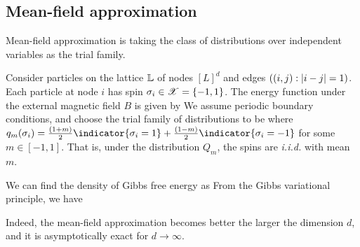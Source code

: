 \documentclass[letterpaper,english,10pt]{article}
\begin{document}
\subsection{Mean-field approximation}
Mean-field approximation is taking the class of distributions over independent variables as the trial family. 
\begin{shaded*}
\begin{exmp} 
Consider particles on the lattice $\mathbb{L}$ of nodes $[L]^d$ and edges $((i,j): \left\lvert i-j\right\rvert=1)$. 
Each particle at node $i$ has spin $\sigma_i \in \mathscr{X} = \left\{-1,1\right\}$. 
The energy function under the external magnetic field $B$ is given by 
We assume periodic boundary conditions, and choose the trial family of distributions to be 
where $q_m(\sigma_i) = \frac{(1+m)}{2}\indicator{\sigma_i=1}+ \frac{(1-m)}{2}\indicator{\sigma_i=-1}$ for some $m \in [-1,1]$. 
That is, under the distribution $Q_m$, the spins are \emph{i.i.d.} with mean $m$. 

We can find the density of Gibbs free energy as 
From the Gibbs variational principle, we have 
\end{exmp}
\end{shaded*}
Indeed, the mean-field approximation becomes better the larger the dimension $d$, and it is asymptotically exact for $d \to \infty$.
\end{document}
